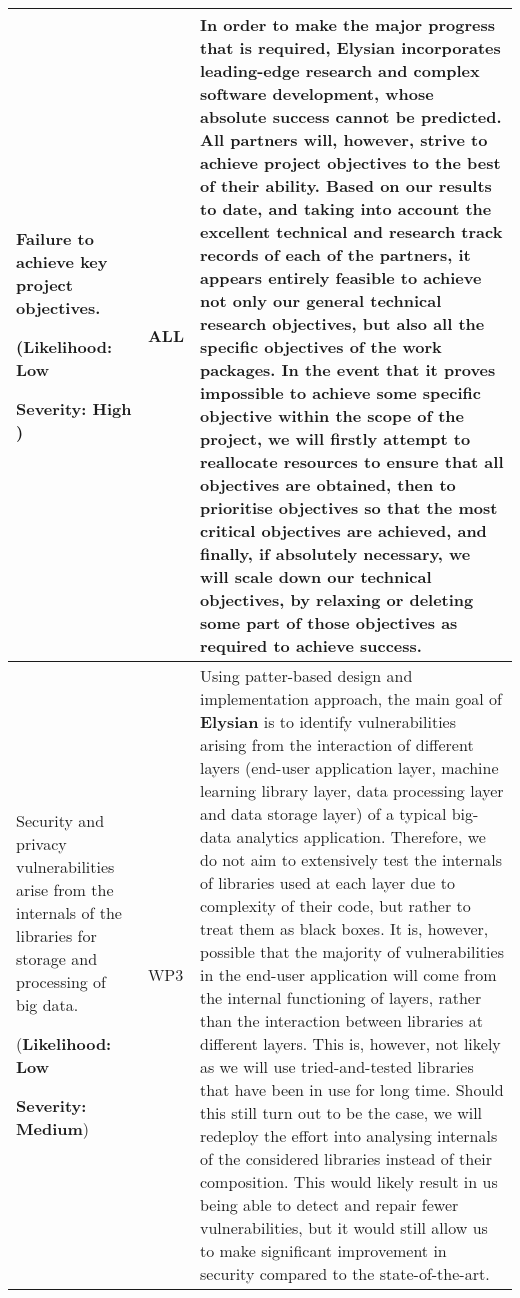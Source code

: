 \documentclass[a4paper,11pt]{article}
\newcommand{\project}[1]{\textbf{#1}\xspace}
\newcommand{\SECURITY}{\project{Elysian}}
\newcommand{\TheProject}{\SECURITY}
\begin{document}
\begin{longtable}{| p{3.5cm} | p{1.5cm} | p{11.8cm}  |}
\\\hline
Failure to achieve key project objectives.
\par
(\textbf{Likelihood: Low}
\par
\textbf{Severity: High}
)
& ALL & 
In order to make the major progress that is required,
\TheProject{} incorporates leading-edge
research and complex software development, whose absolute success cannot be predicted. 
All partners will, however, strive to achieve project objectives
to the best of their ability.  Based on our results to date, and taking into account
the excellent technical and research track records of each of
the partners, it appears entirely feasible to achieve not only our general
technical research objectives, but also all the specific objectives
of the work packages.  In the event that it
proves impossible to achieve some specific objective within the
scope of the project, we will firstly attempt to reallocate
resources to ensure that all objectives are obtained, then
to prioritise objectives so that the most critical objectives are achieved,
and finally, if absolutely necessary, we will scale down our technical objectives, by
relaxing or deleting some part of those objectives as required
to achieve success. 

\\\hline
Security and privacy vulnerabilities arise from the internals of the libraries for storage and processing of big data.
\par
({\textbf{Likelihood: Low}}
\par
{\textbf{Severity: Medium}})
& WP3 &
Using patter-based design and implementation approach, the main goal of \TheProject{} is to identify vulnerabilities arising from the interaction of different layers (end-user application layer, machine learning library layer, data processing layer and data storage layer) of a typical big-data analytics application. Therefore, we do not aim to extensively test the internals of libraries used at each layer due to complexity of their code, but rather to treat them as black boxes. It is, however, possible that the majority of vulnerabilities in the end-user application will come from the internal functioning of layers, rather than the interaction between libraries at different layers. This is, however, not likely as we will use tried-and-tested libraries that have been in use for long time. Should this still turn out to be the case, we will redeploy the effort into analysing internals of the considered libraries instead of their composition. This would likely result in us being able to detect and repair fewer vulnerabilities, but it would still allow us to make significant improvement in security compared to the state-of-the-art.
 

\end{longtable}
\end{document}
